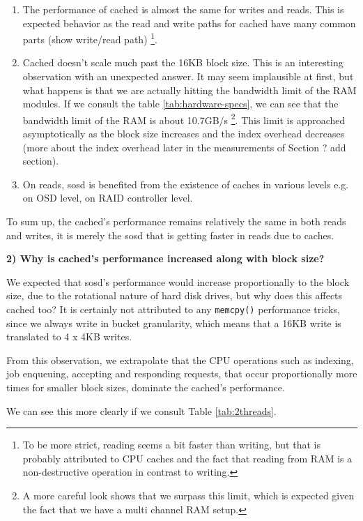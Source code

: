 \begin{enumerate}
	\item The performance of cached is almost the same for writes and 
		reads.  This is expected behavior as the read and write paths 
		for cached have many common parts (\fixme show write/read path)
		\footnote{To be more strict, reading seems a bit faster than 
			writing, but that is probably attributed to CPU caches 
			and the fact that reading from RAM is a non-destructive 
			operation in contrast to writing.}.
	\item Cached doesn't scale much past the 16KB block size. This is an 
		interesting observation with an unexpected answer. It may seem 
		implausible at first, but what happens is that we are actually 
		hitting the bandwidth limit of the RAM modules. If we consult 
		the table \ref{tab:hardware-specs}, we can see that the 
		bandwidth limit of the RAM is about \mytilde10.7GB/s
		\footnote{A more careful look shows that we surpass this limit, 
			which is expected given the fact that we have a multi 
			channel RAM setup.}.
		This limit is approached asymptotically as the block size 
		increases and the index overhead decreases (more about the 
		index overhead later in the measurements of Section ? \fixme 
		add section).
	\item On reads, sosd is benefited from the existence of caches in 
		various levels e.g. on OSD level, on RAID controller level.
\end{enumerate}

To sum up, the cached's performance remains relatively the same in both reads 
and writes, it is merely the sosd that is getting faster in reads due to 
caches. 

\textbf{2) Why is cached's performance increased along with block size?}

We expected that sosd's performance would increase proportionally to the block 
size, due to the rotational nature of hard disk drives, but why does this 
affects cached too? It is certainly not attributed to any \texttt{memcpy()} 
performance tricks, since we always write in bucket granularity, which means 
that a 16KB write is translated to 4 x 4KB writes.

From this observation, we extrapolate that the CPU operations such as indexing,
job enqueuing, accepting and responding requests, that occur proportionally 
more times for smaller block sizes, dominate the cached's performance.

We can see this more clearly if we consult Table \ref{tab:2threads}.


